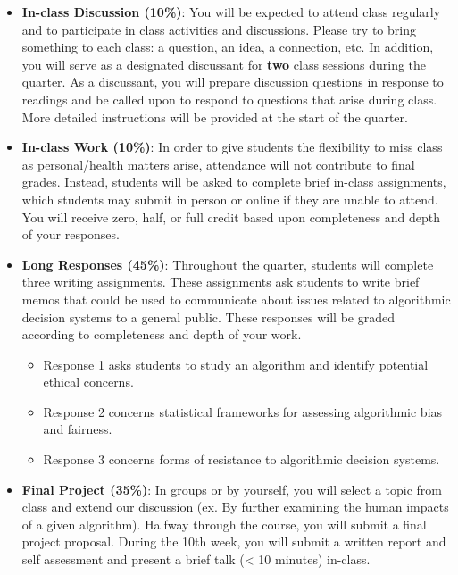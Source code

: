\documentclass[
]{article}
\providecommand{\tightlist}{%
  \setlength{\itemsep}{0pt}\setlength{\parskip}{0pt}}
\begin{document}
\begin{itemize}
\item
  \textbf{In-class Discussion (10\%)}: You will be expected to attend
  class regularly and to participate in class activities and
  discussions. Please try to bring something to each class: a question,
  an idea, a connection, etc. In addition, you will serve as a
  designated discussant for \textbf{two} class sessions during the
  quarter. As a discussant, you will prepare discussion questions in
  response to readings and be called upon to respond to questions that
  arise during class. More detailed instructions will be provided at the
  start of the quarter.
\item
  \textbf{In-class Work (10\%)}: In order to give students the
  flexibility to miss class as personal/health matters arise, attendance
  will not contribute to final grades. Instead, students will be asked
  to complete brief in-class assignments, which students may submit in
  person or online if they are unable to attend. You will receive zero,
  half, or full credit based upon completeness and depth of your
  responses.
\item
  \textbf{Long Responses (45\%)}: Throughout the quarter, students will
  complete three writing assignments. These assignments ask students to
  write brief memos that could be used to communicate about issues
  related to algorithmic decision systems to a general public. These
  responses will be graded according to completeness and depth of your
  work.

  \begin{itemize}
  \tightlist
  \item
    Response 1 asks students to study an algorithm and identify
    potential ethical concerns.
  \item
    Response 2 concerns statistical frameworks for assessing algorithmic
    bias and fairness.
  \item
    Response 3 concerns forms of resistance to algorithmic decision
    systems.
  \end{itemize}
\item
  \textbf{Final Project (35\%)}: In groups or by yourself, you will
  select a topic from class and extend our discussion (ex. By further
  examining the human impacts of a given algorithm). Halfway through the
  course, you will submit a final project proposal. During the 10th
  week, you will submit a written report and self assessment and present
  a brief talk (\textless{} 10 minutes) in-class.
\end{itemize}
\end{document}
